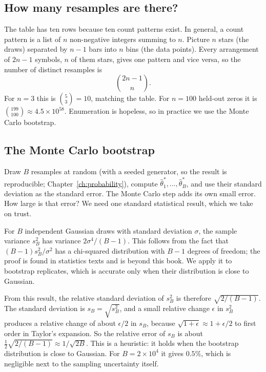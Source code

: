 \subsection{How many resamples are there?}

The table has ten rows because ten count patterns exist. In general, a count pattern is a list of $n$ non-negative integers summing to $n$. Picture $n$ stars (the draws) separated by $n-1$ bars into $n$ bins (the data points). Every arrangement of $2n-1$ symbols, $n$ of them stars, gives one pattern and vice versa, so the number of distinct resamples is
\begin{equation}
\binom{2n-1}{n}.
\label{eq:controls-distinct}
\end{equation}
For $n=3$ this is $\binom53=10$, matching the table. For $n=100$ held-out zeros it is $\binom{199}{100}\approx4.5\times10^{58}$. Enumeration is hopeless, so in practice we use the Monte Carlo bootstrap.

\subsection{The Monte Carlo bootstrap}

Draw $B$ resamples at random (with a seeded generator, so the result is reproducible; Chapter~\ref{ch:probability}), compute $\hat\theta^*_1,\dots,\hat\theta^*_B$, and use their standard deviation as the standard error. The Monte Carlo step adds its own small error. How large is that error? We need one standard statistical result, which we take on trust.
\begin{beyond}
For $B$ independent Gaussian draws with standard deviation $\sigma$, the sample variance $s_B^2$ has variance $2\sigma^4/(B-1)$. This follows from the fact that $(B-1)s_B^2/\sigma^2$ has a chi-squared distribution with $B-1$ degrees of freedom; the proof is found in statistics texts and is beyond this book. We apply it to bootstrap replicates, which is accurate only when their distribution is close to Gaussian.
\end{beyond}
From this result, the relative standard deviation of $s_B^2$ is therefore $\sqrt{2/(B-1)}$. The standard deviation is $s_B=\sqrt{s_B^2}$, and a small relative change $\epsilon$ in $s_B^2$ produces a relative change of about $\epsilon/2$ in $s_B$, because $\sqrt{1+\epsilon}\approx1+\epsilon/2$ to first order in Taylor's expansion. So the relative error of $s_B$ is about $\tfrac12\sqrt{2/(B-1)}\approx1/\sqrt{2B}$. This is a heuristic: it holds when the bootstrap distribution is close to Gaussian. For $B=2\times10^4$ it gives $0.5\%$, which is negligible next to the sampling uncertainty itself.

